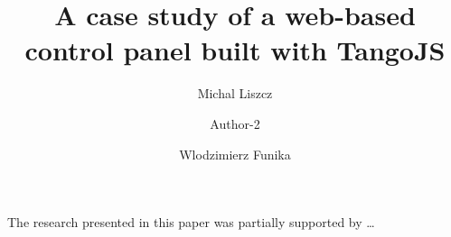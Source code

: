 \documentclass[10pt]{article}
\begin{document}
\begin{opening}

\title{A case study of a web-based control panel built with TangoJS}

\author[Institution, address, the first author's e-mail address]{Michal Liszcz}

\author[Institution, address, the second author's e-mail address]{Author-2}

\author[Institution1, address1, the fourth author's e-mail address1
        Institution2, address2, the fourth author's e-mail address2,]{Wlodzimierz Funika}

\begin{abstract}
    
\end{abstract}


\end{opening}



\begin{acknowledgements}
 The research presented in this paper was partially supported by \ldots
\end{acknowledgements}




\end{document}
